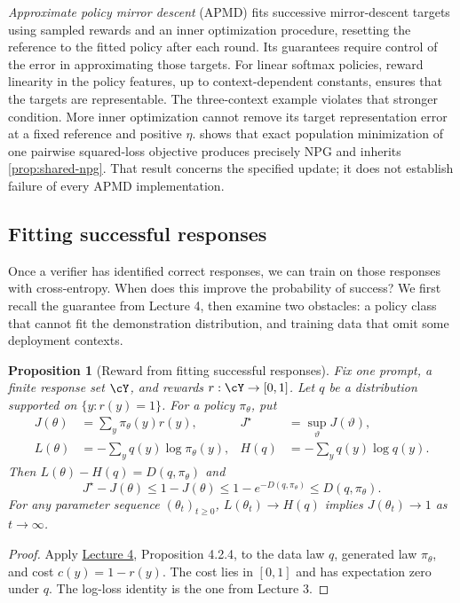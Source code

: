 \documentclass[11pt,twoside]{article}
\newcommand{\KL}{D}
\newtheorem{proposition}[theorem]{Proposition}
\theoremstyle{definition}
\theoremstyle{remark}
\begin{document}
\emph{Approximate policy mirror descent} (APMD) fits successive
mirror-descent targets using sampled rewards and an inner optimization
procedure, resetting the reference to the fitted policy after each round.
Its guarantees require control of the error in approximating those targets.
For linear softmax policies, reward linearity in the policy features,
up to context-dependent constants, ensures that the targets are representable.
The three-context example violates that stronger condition. More inner
optimization cannot remove its target representation error at a fixed
reference and positive $\eta$.
 shows that exact population minimization of one pairwise
squared-loss objective produces precisely NPG and inherits
\cref{prop:shared-npg}. That result concerns the specified update; it does
not establish failure of every APMD implementation.

\subsection{Fitting successful responses}
\label{sec:successful-fitting}

Once a verifier has identified correct responses, we can train on those
responses with cross-entropy. When does this improve the probability of
success? We first recall the guarantee from Lecture 4, then examine two
obstacles: a policy class that cannot fit the demonstration distribution,
and training data that omit some deployment contexts.

\begin{proposition}[Reward from fitting successful responses]
\label{prop:successful-fitting}
Fix one prompt, a finite response set $\cY$, and rewards
$r:\cY\to[0,1]$. Let $q$ be a distribution supported on
$\{y:r(y)=1\}$. For a policy $\pi_\theta$, put
\[
 \begin{aligned}
 J(\theta)&=\sum_y\pi_\theta(y)r(y),
 &J^\star&=\sup_{\vartheta}J(\vartheta),\\
 L(\theta)&=-\sum_yq(y)\log\pi_\theta(y),
 &H(q)&=-\sum_yq(y)\log q(y).
 \end{aligned}
\]
Then $L(\theta)-H(q)=\KL(q,\pi_\theta)$ and
\begin{equation}
 J^\star-J(\theta)\le1-J(\theta)
 \le 1-e^{-\KL(q,\pi_\theta)}
 \le \KL(q,\pi_\theta).
 \label{eq:successful-fitting}
\end{equation}
For any parameter sequence $(\theta_t)_{t\ge0}$,
$L(\theta_t)\to H(q)$ implies $J(\theta_t)\to1$ as $t\to\infty$.
\end{proposition}
\begin{proof}
Apply \href{lecture04.pdf}{Lecture 4}, Proposition 4.2.4, to the data law
$q$, generated law $\pi_\theta$, and cost $c(y)=1-r(y)$.
The cost lies in $[0,1]$ and has expectation zero under $q$.
The log-loss identity is the one from Lecture 3.
\end{proof}
\end{document}
